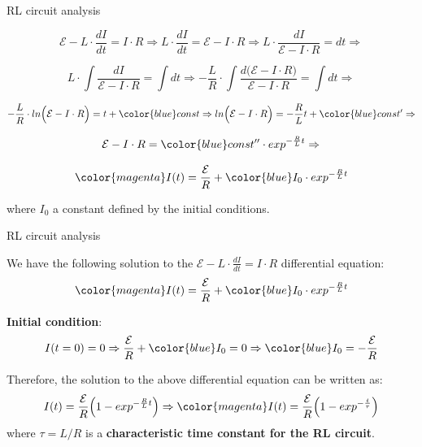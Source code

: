 \begin{frame}{RL circuit analysis}

\begin{equation*}
     \mathcal{E} -L \cdot \frac{dI}{dt} = I \cdot R \Rightarrow
     L \cdot \frac{dI}{dt} =  \mathcal{E} - I \cdot R \Rightarrow
     L \cdot \frac{dI}{\mathcal{E} - I \cdot R} =  dt \Rightarrow
\end{equation*}

\begin{equation*}
     L \cdot \int \frac{dI}{\mathcal{E} - I \cdot R} = \int  dt \Rightarrow
    -\frac{L}{R} \cdot \int \frac{d\Big( \mathcal{E} - I \cdot R \Big)}{\mathcal{E} - I \cdot R} = \int  dt \Rightarrow
\end{equation*}

\begin{equation*}
    -\frac{L}{R} \cdot ln\Big( \mathcal{E} - I \cdot R \Big) = t + {\color{blue}const } \Rightarrow
    ln\Big( \mathcal{E} - I \cdot R \Big) = - \frac{R}{L} t + {\color{blue} const^{\prime} } \Rightarrow
\end{equation*}

\begin{equation*}
    \mathcal{E} - I \cdot R = {\color{blue} const^{\prime \prime} }  \cdot exp^{-\frac{R}{L} t} \Rightarrow
\end{equation*}

\begin{equation*}
    {\color{magenta} I(t) = \frac{\mathcal{E}}{R} + {\color{blue} I_0 } \cdot exp^{-\frac{R}{L} t} }
\end{equation*}

where $I_0$ a constant defined by the initial conditions.

\end{frame}

%
%
%

\begin{frame}{RL circuit analysis}

We have the following solution to the $\displaystyle \mathcal{E} -L \cdot \frac{dI}{dt} = I \cdot R$ differential equation:
\begin{equation*}
    {\color{magenta} I(t) = \frac{\mathcal{E}}{R} + {\color{blue} I_0 } \cdot exp^{-\frac{R}{L} t} }
\end{equation*}

{\bf Initial condition}:\\
\begin{equation*}
       I(t=0) = 0 \Rightarrow  \frac{\mathcal{E}}{R} + {\color{blue} I_0 } = 0 \Rightarrow {\color{blue} I_0 } = - \frac{\mathcal{E}}{R}
\end{equation*}

Therefore, the solution to the above differential equation  can be written as:
\begin{equation*}
   I(t) = \frac{\mathcal{E}}{R} \Big(1 - exp^{-\frac{R}{L} t} \Big)
  \Rightarrow
   {\color{magenta}
       I(t) = \frac{\mathcal{E}}{R} \Big(1 - exp^{-\frac{t}{\tau}} \Big)
   }
\end{equation*}
where $\tau = L/R$ is a {\bf characteristic time constant for the RL circuit}.

\end{frame}

